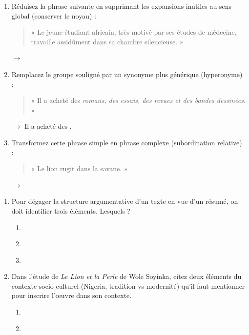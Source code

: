 \documentclass[11pt]{article}
\begin{document}
\begin{exercice}
\begin{enumerate}
    \item Réduisez la phrase suivante en supprimant les expansions inutiles au sens global (conserver le noyau) :
    \begin{quote}
    « Le jeune étudiant africain, très motivé par ses études de médecine, travaille assidûment dans sa chambre silencieuse. »
    \end{quote}
    $\rightarrow$ \underline{\hspace{14cm}}
    \item Remplacez le groupe souligné par un synonyme plus générique (hyperonyme) :
    \begin{quote}
    « Il a acheté des \textit{romans, des essais, des revues et des bandes dessinées}. »
    \end{quote}
    $\rightarrow$ Il a acheté des \underline{\hspace{5cm}}.
    \item Transformez cette phrase simple en phrase complexe (subordination relative) :
    \begin{quote}
    « Le lion rugit dans la savane. »
    \end{quote}
    $\rightarrow$ \underline{\hspace{14cm}}
\end{enumerate}
\end{exercice}

\begin{exercice}
\begin{enumerate}
    \item Pour dégager la structure argumentative d'un texte en vue d'un résumé, on doit identifier trois éléments. Lesquels ?
    \begin{enumerate}
        \item \underline{\hspace{10cm}}
        \item \underline{\hspace{10cm}}
        \item \underline{\hspace{10cm}}
    \end{enumerate}
    \item Dans l'étude de \textit{Le Lion et la Perle} de Wole Soyinka, citez deux éléments du contexte socio-culturel (Nigeria, tradition vs modernité) qu'il faut mentionner pour inscrire l'œuvre dans son contexte.
    \begin{enumerate}
        \item \underline{\hspace{10cm}}
        \item \underline{\hspace{10cm}}
    \end{enumerate}
\end{enumerate}
\end{exercice}
\end{document}

